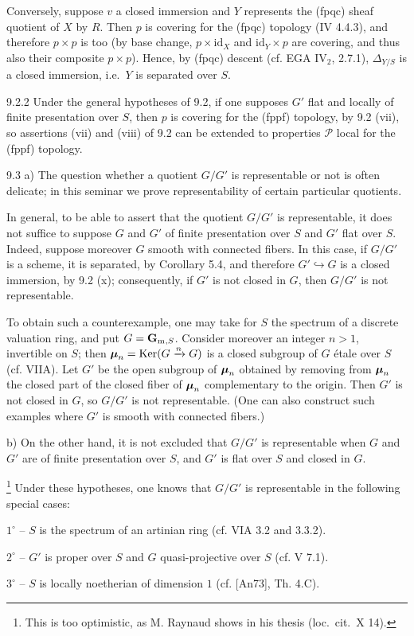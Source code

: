 Conversely, suppose $v$ a closed immersion and $Y$ represents the (fpqc) sheaf quotient of $X$ by $R$. Then $p$ is covering for the (fpqc) topology (IV 4.4.3), and therefore $p\times p$ is too (by base change, $p\times\mathrm{id}_X$ and $\mathrm{id}_Y\times p$ are covering, and thus also their composite $p\times p$). Hence, by (fpqc) descent (cf. EGA IV$_2$, 2.7.1), $\Delta_{Y/S}$ is a closed immersion, i.e.\ $Y$ is separated over $S$.

\begin{remark}{9.2.2}\label{VIB.9.2.2}
Under the general hypotheses of 9.2, if one supposes $G'$ flat and locally of finite presentation over $S$, then $p$ is covering for the (fppf) topology, by 9.2 (vii), so assertions (vii) and (viii) of 9.2 can be extended to properties $\mathscr P$ local for the (fppf) topology.
\end{remark}

\begin{remark}{9.3}\label{VIB.9.3}
a) The question whether a quotient $G/G'$ is representable or not is often delicate; in this seminar we prove representability of certain particular quotients.

In general, to be able to assert that the quotient $G/G'$ is representable, it does not suffice to suppose $G$ and $G'$ of finite presentation over $S$ and $G'$ flat over $S$. Indeed, suppose moreover $G$ smooth with connected fibers. In this case, if $G/G'$ is a scheme, it is separated, by Corollary 5.4, and therefore $G'\hookrightarrow G$ is a closed immersion, by 9.2 (x); consequently, if $G'$ is not closed in $G$, then $G/G'$ is not representable.

To obtain such a counterexample, one may take for $S$ the spectrum of a discrete valuation ring, and put $G=\mathbf{G}_{\mathrm{m}}{}_{,S}$. Consider moreover an integer $n>1$, invertible on $S$; then $\boldsymbol{\mu}_n=\operatorname{Ker}(G\xrightarrow{n}G)$ is a closed subgroup of $G$ étale over $S$ (cf. VIIA). Let $G'$ be the open subgroup of $\boldsymbol{\mu}_n$ obtained by removing from $\boldsymbol{\mu}_n$ the closed part of the closed fiber of $\boldsymbol{\mu}_n$ complementary to the origin. Then $G'$ is not closed in $G$, so $G/G'$ is not representable. (One can also construct such examples where $G'$ is smooth with connected fibers.)

b) On the other hand, it is not excluded that $G/G'$ is representable when $G$ and $G'$ are of finite presentation over $S$, and $G'$ is flat over $S$ and closed in $G$.\begingroup\renewcommand{\thefootnote}{*}\addtocounter{footnote}{-1}\footnote{This is too optimistic, as M. Raynaud shows in his thesis (loc.\ cit.\ X 14).}\endgroup{} Under these hypotheses, one knows that $G/G'$ is representable in the following special cases:

$1^\circ$ -- $S$ is the spectrum of an artinian ring (cf. VIA 3.2 and 3.3.2).

$2^\circ$ -- $G'$ is proper over $S$ and $G$ quasi-projective over $S$ (cf. V 7.1).

$3^\circ$ -- $S$ is locally noetherian of dimension $1$ (cf. [An73], Th. 4.C).
\end{remark}

